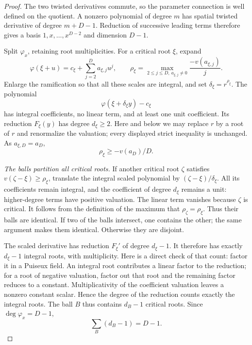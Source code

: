 \documentclass[11pt]{article}
\theoremstyle{definition}\newtheorem{definition}[theorem]{Definition}
\theoremstyle{remark}\newtheorem{remark}[theorem]{Remark}
\begin{document}
\begin{proof}
The two twisted derivatives commute, so the parameter connection
is well defined on the quotient. A nonzero polynomial of degree $m$
has spatial twisted derivative of degree $m+D-1$. Reduction of
successive leading terms therefore gives a basis
$1,x,\ldots,x^{D-2}$ and dimension $D-1$.

Split $\varphi_x$, retaining root multiplicities. For a critical root
$\xi$, expand
\[
 \varphi(\xi+u)=c_\xi+\sum_{j=2}^D a_{\xi,j}u^j,
 \qquad
 \rho_\xi=\max_{2\leq j\leq D,\ a_{\xi,j}\ne0}
                    \frac{-v(a_{\xi,j})}{j}.
\]
Enlarge the ramification so that all these scales are integral, and
set $\delta_\xi=r^{\rho_\xi}$. The polynomial
\[
 \varphi(\xi+\delta_\xi y)-c_\xi
\]
has integral coefficients, no linear term, and at least one unit
coefficient. Its reduction $F_\xi(y)$ has degree $d_\xi\geq2$.
Here and below we may replace $r$ by a root of $r$ and renormalize
the valuation; every displayed strict inequality is unchanged.
As $a_{\xi,D}=a_D$,
\begin{equation}\label{eq:balllower}
 \rho_\xi\geq-v(a_D)/D.
\end{equation}

\emph{The balls partition all critical roots.}
If another critical root $\zeta$ satisfies
$v(\zeta-\xi)\geq\rho_\xi$, translate the integral scaled polynomial
by $(\zeta-\xi)/\delta_\xi$. All its coefficients remain integral,
and the coefficient of degree $d_\xi$ remains a unit: higher-degree
terms have positive valuation. The linear term vanishes because
$\zeta$ is critical. It follows from the definition of the maximum
that $\rho_\zeta=\rho_\xi$. Thus their balls are identical.
If two of the balls intersect, one contains the other; the same
argument makes them identical. Otherwise they are disjoint.

The scaled derivative has reduction $F_\xi'$ of degree $d_\xi-1$.
It therefore has exactly $d_\xi-1$ integral roots, with multiplicity.
Here is a direct check of that count: factor it in a Puiseux field.
An integral root contributes a linear factor to the reduction;
for a root of negative valuation, factor out that root and the
remaining factor reduces to a constant. Multiplicativity of the
coefficient valuation leaves a nonzero constant scalar. Hence the
degree of the reduction counts exactly the integral roots.
The ball $B$ thus contains $d_B-1$ critical roots. Since
$\deg\varphi_x=D-1$,
\begin{equation}\label{eq:ballrankcount}
 \sum_B(d_B-1)=D-1.
\end{equation}


\end{proof}
\end{document}

